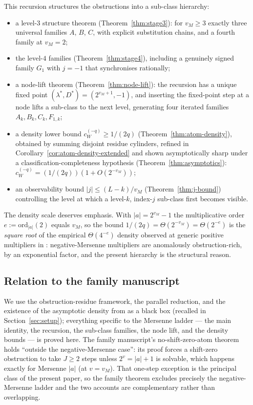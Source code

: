 \documentclass[11pt,reqno]{amsart}
\theoremstyle{plain}
\theoremstyle{definition}
\theoremstyle{remark}
\newcommand{\vM}{v_{M}}
\newcommand{\ord}{\mathrm{ord}}
\newcommand{\cWq}{c_{W}^{(-q)}}
\begin{document}
This recursion structures the obstructions into a sub-class hierarchy:
\begin{itemize}[leftmargin=1.4em]
\item a level-$3$ structure theorem (Theorem~\ref{thm:stage3}): for
  $\vM \ge 3$ exactly three universal families $A$, $B$, $C$, with explicit
  substitution chains, and a fourth family at $\vM = 2$;
\item the level-$4$ families (Theorem~\ref{thm:stage4}), including a
  genuinely signed family $G_1$ with $j = -1$ that synchronises rationally;
\item a node-lift theorem (Theorem~\ref{thm:node-lift}): the recursion has a
  unique fixed point $(\lambda^*, D^*) = (2^{\vM+1}, -1)$, and inserting the
  fixed-point step at a node lifts a sub-class to the next level, generating
  four iterated families $A_k, B_k, C_k, F_{1,k}$;
\item a density lower bound $\cWq \ge 1/(2q)$
  (Theorem~\ref{thm:atom-density}), obtained by summing disjoint residue
  cylinders, refined in Corollary~\ref{cor:atom-density-extended} and shown
  asymptotically sharp under a classification-completeness hypothesis
  (Theorem~\ref{thm:asymptotics}): $\cWq = (1/(2q))(1 + O(2^{-\vM}))$;
\item an observability bound $\lvert j \rvert \le (L - k)/\vM$
  (Theorem~\ref{thm:j-bound}) controlling the level at which a level-$k$,
  index-$j$ sub-class first becomes visible.
\end{itemize}

The density scale deserves emphasis. With $\lvert a \rvert = 2^{\vM} - 1$ the
multiplicative order $e := \ord_{\lvert a \rvert}(2)$ equals $\vM$, so the
bound $1/(2q) = \Theta(2^{-\vM}) = \Theta(2^{-e})$ is the \emph{square root}
of the empirical $\Theta(4^{-e})$ density observed at generic positive
multipliers in \cite{ObstructionResiduesFamily2026}: negative-Mersenne
multipliers are anomalously obstruction-rich, by an exponential factor, and
the present hierarchy is the structural reason.

\subsection{Relation to the family manuscript}

We use the obstruction-residue framework, the parallel reduction, and the
existence of the asymptotic density from
\cite{ObstructionResiduesFamily2026} as a black box (recalled in
Section~\ref{sec:setup}); everything specific to the Mersenne ladder ---
the main identity, the recursion, the sub-class families, the node lift, and
the density bounds --- is proved here. The family manuscript's
no-shift-zero-atom theorem holds ``outside the negative-Mersenne case'': its
proof forces a shift-zero obstruction to take $J \ge 2$ steps unless
$2^v = \lvert a \rvert + 1$ is solvable, which happens exactly for Mersenne
$\lvert a \rvert$ (at $v = \vM$). That one-step exception is the principal
class of the present paper, so the family theorem excludes precisely the
negative-Mersenne ladder and the two accounts are complementary rather than
overlapping.
\end{document}
